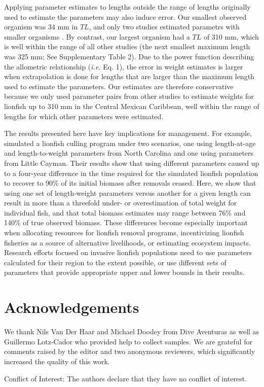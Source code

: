 \documentclass[fleqn,10pt,lineno]{wlpeerj} %
\begin{document}
Applying parameter estimates to lengths outside the range of lengths
originally used to estimate the parameters may also induce error. Our
smallest observed organism was 34 mm in \(TL\), and only two studies
estimated parametrs with smaller organisms
\citep{edwards_2014,sabidoitza_2016}. By contrast, our largest organism
had a \(TL\) of 310 mm, which is well within the range of all other
studies (the next smallest maximum length was 325 mm; See Supplementary
Table 2). Due to the power function describing the allometric
relationship (\emph{i.e.} Eq. 1), the error in weight estimates is
larger when extrapolation is done for lengths that are larger than the
maximum length used to estimate the parameters. Our estimates are
therefore conservative because we only used parameter pairs from other
studies to estimate weights for lionfish up to 310 mm in the Central
Mexican Caribbean, well within the range of lengths for which other
parameters were estimated.

The results presented here have key implications for management. For
example, \citet{edwards_2014} simulated a lionfish culling program under
two scenarios, one using length-at-age and length-to-weight parameters
from North Carolina and one using parameters from Little Cayman. Their
results show that using different parameters caused up to a four-year
difference in the time required for the simulated lionfish population to
recover to 90\% of its initial biomass after removals ceased. Here, we
show that using one set of length-weight parameters versus another for a
given length can result in more than a threefold under- or
overestimation of total weight for individual fish, and that total
biomass estimates may range between 76\% and 140\% of true observed
biomass. These differences become especially important when allocating
resources for lionfish removal programs, incentivizing lionfish
fisheries as a source of alternative livelihoods, or estimating
ecosystem impacts. Research efforts focused on invasive lionfish
populations need to use parameters calculated for their region to the
extent possible, or use different sets of parameters that provide
appropriate upper and lower bounds in their results.

\section*{Acknowledgements}

We thank Nils Van Der Haar and Michael Doodey from Dive Aventuras as
well as Guillermo Lotz-Cador who provided help to collect samples. We
are grateful for comments raised by the editor and two anonymous
reviewers, which significantly increased the quality of this work.

Conflict of Interest: The authors declare that they have no conflict of
interest.


\end{document}
